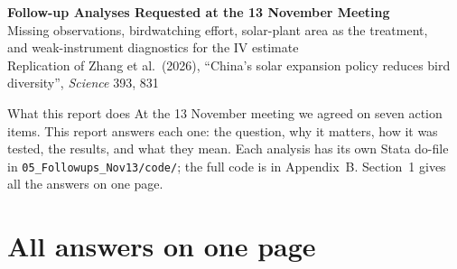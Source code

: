 \documentclass[11pt]{article}
\begin{document}
\begin{center}
{\LARGE\bfseries Follow-up Analyses Requested at the 13 November Meeting}\\[6pt]
{\large Missing observations, birdwatching effort, solar-plant area as the treatment,\\ and weak-instrument diagnostics for the IV estimate}\\[6pt]
{\small Replication of Zhang et al.\ (2026), ``China's solar expansion policy reduces bird diversity'', \textit{Science} 393, 831}
\end{center}

\vspace{4pt}
\begin{keybox}{What this report does}
At the 13 November meeting we agreed on seven action items. This report answers each one: the question, why it matters, how it was tested, the results, and what they mean. Each analysis has its own Stata do-file in \texttt{05\_Followups\_Nov13/code/}; the full code is in Appendix~B. Section~1 gives all the answers on one page.
\end{keybox}

\tableofcontents
\newpage

\section{All answers on one page}
\end{document}
